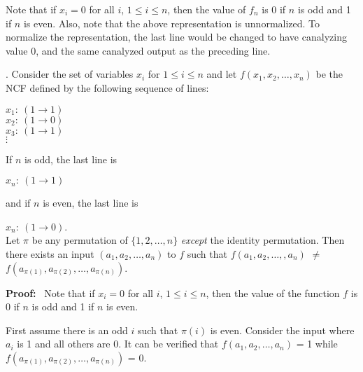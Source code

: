 Note that if $x_i = 0$ for all $i$, $1 \leq i \leq n$, then the
value of $f_n$ is 0 if $n$ is odd and 1 if $n$ is even.
Also, note that the above representation is unnormalized. To normalize the representation,
the last line would be changed to have canalyzing value 0, and the same canalyzed output as the preceding line.






\iffalse
\begin{theorem}\label{thm:ncf_asymmetry}.
Consider the set of variables $x_i$ for $1 \leq i \leq n$ and 
let $f(x_1, x_2, \ldots, x_n)$ be the NCF defined by the following sequence
of lines:

\medskip
\noindent
\hspace*{0.5in}
$x_1:~ (1 \rightarrow 1)$ \\
\hspace*{0.5in}
$x_2:~ (1 \rightarrow 0)$ \\
\hspace*{0.5in}
$x_3:~ (1 \rightarrow 1)$ \\
\hspace*{0.75in}
$\vdots$ 

\noindent
If $n$ is odd, the last line is 

\noindent
\hspace*{0.5in}
$x_n:~ (1 \rightarrow 1)$ 

\noindent
and if $n$ is even, the last line is 

\noindent
\hspace*{0.5in}
$x_n:~ (1 \rightarrow 0)$. \\

\noindent
Let $\pi$ be any permutation of $\{1, 2, \ldots, n\}$
\emph{except} the identity permutation.
Then there exists an input $(a_1, a_2, \ldots,  a_n)$ 
to $f$ such that $f(a_1, a_2, \ldots, ,a_n)$ $\neq$  
$f(a_{\pi(1)}, a_{\pi(2)}, \ldots, a_{\pi(n)})$.
\end{theorem}

\noindent
\textbf{Proof:}~ 
Note that if $x_i = 0$ for all $i$, $1 \leq i \leq n$, then the
value of the function $f$ is 0 if $n$ is odd and 1 if $n$ is even.

First assume there is an odd $i$ such that $\pi(i)$ is even. 
Consider the input where $a_i$ is 1 and all others are 0. 
It can be verified that $f(a_1, a_2, \ldots, a_n)$ = 1 while
$f(a_{\pi(1)}, a_{\pi(2)}, \ldots, a_{\pi(n)})$ = 0.

